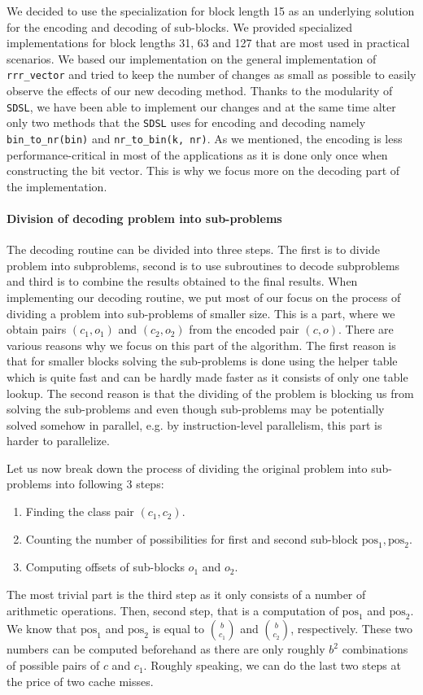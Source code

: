 We decided to use the specialization for block length 15 as an underlying solution for the encoding and
decoding of sub-blocks. We provided specialized implementations for block lengths 31, 63 and 127 that
are most used in practical scenarios. We based our implementation on the general implementation of
\verb'rrr_vector' and tried to keep the number of changes as small as possible to easily observe the
effects of our new decoding method. Thanks to the modularity of \texttt{SDSL}, we have been able to
implement our changes and at the same time alter only two methods that the \texttt{SDSL} uses for
encoding and decoding namely \verb'bin_to_nr(bin)' and \verb'nr_to_bin(k, nr)'. As we mentioned,
the encoding is less performance-critical in most of the applications as it is done only once when
constructing the bit vector. This is why we focus more on the decoding part of the implementation.

\paragraph{Division of decoding problem into sub-problems}

The decoding routine can be divided into three steps. The first is to divide problem into subproblems,
second is to use subroutines to decode subproblems and third is to combine the results obtained to the final
results. When implementing our decoding routine, we put most of our focus on the process of dividing
a problem into sub-problems of smaller size. This is a part, where we obtain pairs $(c_1, o_1)$ and $(c_2, o_2)$
from the encoded pair $(c, o)$. There are various reasons why we focus on this part of the algorithm.
The first reason is that for smaller blocks solving the sub-problems is done using the helper table
which is quite fast and can be hardly made faster as it consists of only one table lookup. The second
reason is that the dividing of the problem is blocking us from solving the sub-problems and even though
sub-problems may be potentially solved somehow in parallel, e.g. by instruction-level parallelism, this
part is harder to parallelize.

Let us now break down the process of dividing the original problem into sub-problems into following 3 steps:
\begin{enumerate}
	\item Finding the class pair $(c_1, c_2)$.
	\item Counting the number of possibilities for first and second sub-block $\text{pos}_1, \text{pos}_2$.
	\item Computing offsets of sub-blocks $o_1$ and $o_2$.
\end{enumerate}
The most trivial part is the third step as it only consists of a number of arithmetic operations. Then,
second step, that is a computation of $\text{pos}_1$ and $\text{pos}_2$. We know that $\text{pos}_1$
and $\text{pos}_2$ is equal to ${b\choose c_1}$ and ${b\choose c_2}$, respectively. These two numbers
can be computed beforehand as there are only roughly $b^2$ combinations of possible pairs of $c$ and $c_1$.
Roughly speaking, we can do the last two steps at the price of two cache misses.

